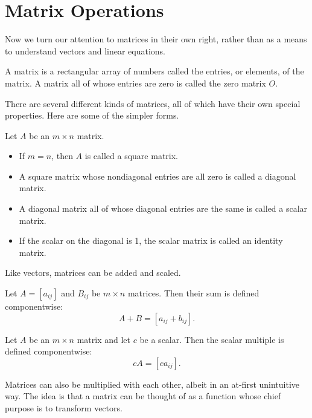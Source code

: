 \documentclass[../m73main.tex]{subfiles}
\begin{document}
\section{Matrix Operations}
Now we turn our attention to matrices in their own right, rather than as a means to understand vectors and linear equations.

\begin{definition}[Matrix]
	A matrix is a rectangular array of numbers called the entries, or elements, of the matrix.
	A matrix all of whose entries are zero is called the zero matrix $O$.
\end{definition}

There are several different kinds of matrices, all of which have their own special properties.
Here are some of the simpler forms.

\begin{definition}
	Let $A$ be an $m \times n$ matrix.
	\begin{itemize}
		\item If $ m =n$, then $A$ is called a square matrix.
		\item A square matrix whose nondiagonal entries are all zero is called a diagonal matrix.
		\item A diagonal matrix all of whose diagonal entries are the same is called a scalar matrix.
		\item If the scalar on the diagonal is 1, the scalar matrix is called an identity matrix.
	\end{itemize}
\end{definition}

Like vectors, matrices can be added and scaled.

\begin{definition}
	Let $A = [a_{ij}]$ and $B_{ij}$ be $m \times n$ matrices.
	Then their sum is defined componentwise:
	\[ A + B = [a_{ij} + b_{ij}]. \]
\end{definition}

\begin{definition}
	Let $A$ be an $m\times n$ matrix and let $c$ be a scalar.
	Then the scalar multiple is defined componentwise:
	\[ cA = [ca_{ij}]. \]
\end{definition}

Matrices can also be multiplied with each other, albeit in an at-first unintuitive way.
The idea is that a matrix can be thought of as a function whose chief purpose is to transform vectors.
\end{document}

